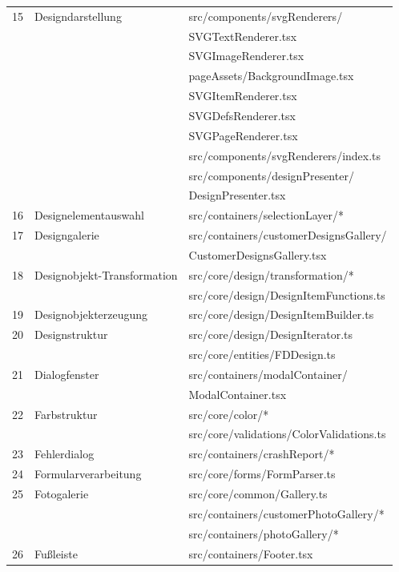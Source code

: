 \begin{longtable}{r@{\hspace{5mm}}lX}
    15 & Designdarstellung & src/components/svgRenderers/ \\
        & & \> SVGTextRenderer.tsx \\
        & & \> SVGImageRenderer.tsx \\
        & & \> pageAssets/BackgroundImage.tsx \\
        & & \> SVGItemRenderer.tsx \\
        & & \> SVGDefsRenderer.tsx \\
        & & \> SVGPageRenderer.tsx \\
        & & src/components/svgRenderers/index.ts \\
        & & src/components/designPresenter/ \\ & & \> DesignPresenter.tsx \\
    \hline
    16 & Designelementauswahl & src/containers/selectionLayer/* \\
    \hline
    17 & Designgalerie & src/containers/customerDesignsGallery/ \\ & & \> CustomerDesignsGallery.tsx \\
    \hline
    18 & Designobjekt-Transformation & src/core/design/transformation/* \\
        & & src/core/design/DesignItemFunctions.ts \\
    \hline
    19 & Designobjekterzeugung & src/core/design/DesignItemBuilder.ts \\
    \hline
    20 & Designstruktur & src/core/design/DesignIterator.ts \\
        & & src/core/entities/FDDesign.ts \\
    \hline
    21 & Dialogfenster & src/containers/modalContainer/ \\ & & \> ModalContainer.tsx \\
    \hline
    22 & Farbstruktur & src/core/color/* \\
        & & src/core/validations/ColorValidations.ts \\
    \hline
    23 & Fehlerdialog & src/containers/crashReport/* \\
    \hline
    24 & Formularverarbeitung & src/core/forms/FormParser.ts \\
    \hline
    25 & Fotogalerie & src/core/common/Gallery.ts \\
        & & src/containers/customerPhotoGallery/* \\
        & & src/containers/photoGallery/* \\
    \hline
    26 & Fußleiste & src/containers/Footer.tsx \\

\end{longtable}
